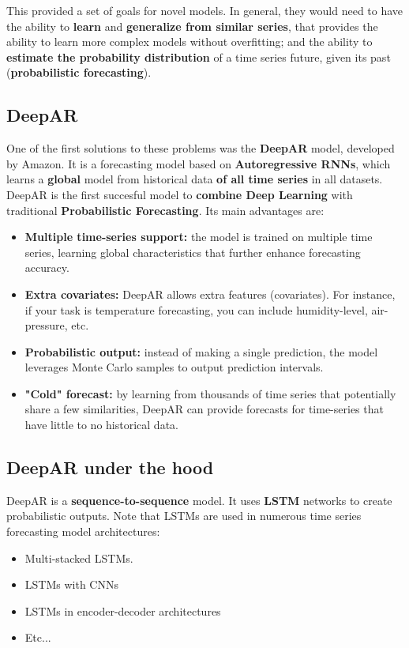 This provided a set of goals for novel models. In general, they would need to have the 
ability to \textbf{learn} and \textbf{generalize from similar series}, that provides the
ability to learn more complex models without overfitting; and the ability to \textbf{estimate
the probability distribution} of a time series future, given its past (\textbf{probabilistic
forecasting}).

\subsection{DeepAR}

One of the first solutions to these problems was the \textbf{DeepAR} model, developed by
Amazon. It is a forecasting model based on \textbf{Autoregressive RNNs}, which learns
a \textbf{global} model from historical data \textbf{of all time series} in all 
datasets.\\

DeepAR is the first succesful model to \textbf{combine Deep Learning} with traditional
\textbf{Probabilistic Forecasting}. Its main advantages are:

\begin{itemize}
    \item \textbf{Multiple time-series support:} the model is trained on multiple time 
    series, learning global characteristics that further enhance forecasting accuracy.

    \item \textbf{Extra covariates:} DeepAR allows extra features (covariates). For instance,
    if your task is temperature forecasting, you can include humidity-level, air-pressure, etc.

    \item \textbf{Probabilistic output:} instead of making a single prediction, the model
    leverages Monte Carlo samples to output prediction intervals.

    \item \textbf{"Cold" forecast:} by learning from thousands of time series that 
    potentially share a few similarities, DeepAR can provide forecasts for time-series
    that have little to no historical data.
\end{itemize}

\subsection{DeepAR under the hood}

DeepAR is a \textbf{sequence-to-sequence} model. It uses \textbf{LSTM} networks to 
create probabilistic outputs. Note that LSTMs are used in numerous time series 
forecasting model architectures:
\begin{itemize}
    \item Multi-stacked LSTMs.
    \item LSTMs with CNNs
    \item LSTMs in encoder-decoder architectures
    \item Etc...
\end{itemize}

